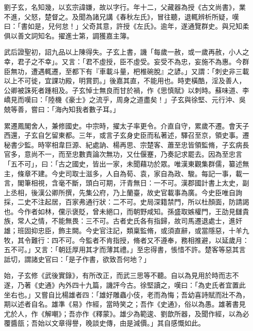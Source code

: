 
\begin{pinyinscope}

 劉子玄，名知幾，以玄宗諱嫌，故以字行。年十二，父藏器為授《古文尚書》，業不進，父怒，楚督之。及聞為諸兄講《春秋左氏》，冒往聽，退輒辨析所疑，嘆曰：「書如是，兒何怠！」父奇其意，許授《左氏》。逾年，遂通覽群史。與兄知柔俱以善文詞知名。擢進士第，調獲嘉主簿。



 武后證聖初，詔九品以上陳得失。子玄上書，譏「每歲一赦，或一歲再赦，小人之幸，君子之不幸」。又言：「君不虛授，臣不虛受。妄受不為忠，妄施不為惠。今群臣無功，遭遇輒遷，至都下有『車載斗量，杷椎碗脫』之諺。」又謂：「刺史非三載以上不可徙，宜課功殿，明賞罰。」後嘉其直，不能用也。時吏橫酷，淫及善人，公卿被誅死者踵相及。子玄悼士無良而甘於禍，作《思慎賦》以刺時。蘇味道、李嶠見而嘆曰：「陸機《豪士》之流乎，周身之道盡矣！」子玄與徐堅、元行沖、吳兢等善，嘗曰：「海內知我者數子耳。」



 累遷鳳閣舍人，兼修國史。中宗時，擢太子率更令。介直自守，累歲不遷。會天子西還，子玄自乞留東都。三年，或言子玄身史臣而私著述，驛召至京，領史事。遷秘書少監。時宰相韋巨源、紀處訥、楊再思、宗楚客、蕭至忠皆領監脩，子玄病長官多，意尚不一，而至忠數責論次無功，又仕偃蹇，乃奏記求罷去。因為至忠言「五不可」，曰：「古之國史，皆出一家，未聞藉功於眾。唯漢東觀集群儒，纂述無主，條章不建。今史司取士滋多，人自為荀、袁，家自為政、駿。每記一事，載一言，閣筆相視，含毫不斷，頭白可期，汗青無日：一不可。漢郡國計書上太史，副上丞相，後漢公卿所撰，先集公府，乃上蘭臺，故史官載事為廣。今史臣唯自詢採，二史不注起居，百家弗通行狀：二不可。史局深籍禁門，所以杜顏面，防請謁也。今作者如林，儻示褒貶，曾未絕口，而朝野咸知。孫盛取嫉權門，王劭見讎貴族，常人之情，不能無畏：三不可。古者史氏各有指歸，故司馬遷退處士，進奸雄；班固抑忠臣，飾主闕。今史官注記，類稟監脩，或須直辭，或當隱惡，十羊九牧，其令難行：四不可。今監者不肯指授，脩者又不遵奉，務相推避，以延歲月：五不可。」又言：「朝廷厚用其才而薄其禮。」至忠得書，悵惜不許。楚客等惡其言詆切，謂諸史官曰：「是子作書，欲致吾何地？」



 始，子玄修《武後實錄》，有所改正，而武三思等不聽。自以為見用於時而志不遂，乃著《史通》內外四十九篇，譏評今古。徐堅讀之，嘆曰：「為史氏者宜置此坐右也。」又嘗自比楊雄者四：「雄好雕蟲小伎，老而為悔；吾幼喜詩賦而壯不為，期以述者自名。雄準《易》作經，當時笑之；吾作《史通》，俗以為愚。雄著書見尤於人，作《解嘲》；吾亦作《釋蒙》。雄少為範逡、劉歆所器，及聞作經，以為必覆醬瓿；吾始以文章得譽，晚談史傳，由是減價。」其自感慨如此。




\end{pinyinscope}
